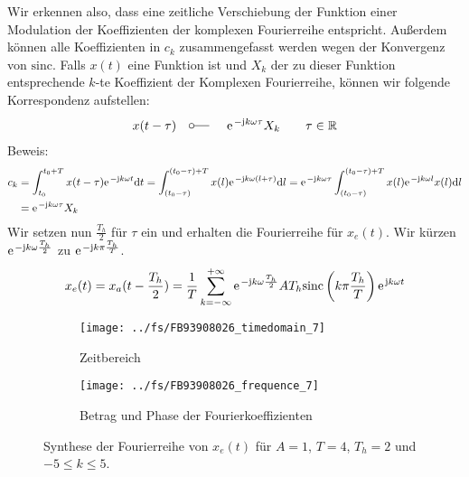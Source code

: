 \documentclass[11pt,a4paper,DIV=12]{scrartcl}
\newcommand{\sinc}{\mathrm{sinc}}
\begin{document}
%
%
Wir erkennen also, dass eine zeitliche Verschiebung der Funktion einer
Modulation der Koeffizienten der komplexen Fourierreihe entspricht.
%
Außerdem können alle Koeffizienten in $c_k$ zusammengefasst werden
wegen der Konvergenz von $\sinc$.
%
Falls $x(t)$ eine Funktion ist und $X_k$ der zu dieser Funktion entsprechende
$k$-te Koeffizient der Komplexen Fourierreihe, können wir folgende
Korrespondenz aufstellen:
%
%
\begin{align}
	x(t-\tau)\quad\fourier\quad\e^{-\im k \omega \tau}X_k\quad\quad\tau\in\mathbb{R}
\end{align}
%
%
Beweis:
%
%
\begin{align}
	c_k&=\int_{t_0}^{t_0+T}x(t-\tau)\e^{-\im k \omega t}\diff t
	=\int_{(t_0-\tau)}^{(t_0-\tau)+T}x(l)\e^{-\im k \omega (l+\tau)}\diff l
	= \e^{-\im k \omega \tau}\int_{(t_0-\tau)}^{(t_0-\tau)+T}x(l)\e^{-\im k \omega l}x(l)\diff l\nonumber \\
	&=\e^{-\im k \omega \tau}X_k
\end{align}
%
%
Wir setzen nun $\frac{T_h}{2}$ für $\tau$ ein und erhalten die Fourierreihe für
$x_{e}(t)$.
%
Wir kürzen $\e^{-\im k \omega \frac{T_h}{2}}$ zu $\e^{-\im k \pi
\frac{T_h}{T}}$.
%
%
\begin{align}
	x_{e}(t)=x_a(t-\frac{T_h}{2})
	=\frac{1}{T}\sum_{k=-\infty}^{+\infty}\e^{-\im k\omega \frac{T_h}{2}}AT_h\sinc\left(k\pi\frac{T_h}{T}\right)\e^{\im k \omega t}
\end{align}
%
\begin{figure}
	\centering
	\begin{subfigure}{\textwidth}
		\texttt{[image: ../fs/FB93908026\_timedomain\_7]}
		\caption{Zeitbereich}
	\end{subfigure}
	\begin{subfigure}{\textwidth}
		\texttt{[image: ../fs/FB93908026\_frequence\_7]}
		\caption{Betrag und Phase der Fourierkoeffizienten}
	\end{subfigure}
	\caption{Synthese der Fourierreihe von $x_e(t)$ für $A=1$, $T=4$, $T_h=2$ und
		$-5\leq k\leq5$.}
\end{figure}

\cleardoublepage
\end{document}
